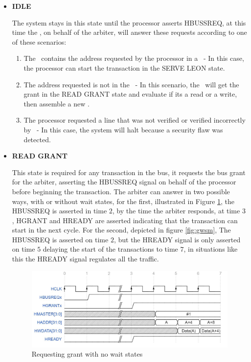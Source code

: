 \begin{itemize}
 \item{\textbf{IDLE}}
 
The system stays in this state until the processor asserts HBUSSREQ, at this time the \handler, on behalf of the arbiter, will answer these requests according to one of these scenarios:
 \begin{enumerate}
     \item The \sbuf~contains the address requested by the processor in a \sline~- In this case, the processor can start the transaction in the SERVE LEON state.
     \item The address requested is not in the \sbuf~- In this scenario, the \handler~will get the grant in the READ GRANT state and evaluate if its a read or a write, then assemble a new \sline.
     \item The processor requested a line that was not verified or verified incorrectly by \seceng~-  In this case, the system will halt because a security flaw was detected.
 \end{enumerate}

 
  \item{\textbf{READ GRANT}}

  This state is required for any transaction in the bus, it requests the bus grant for the arbiter, asserting the HBUSSREQ signal on behalf of the processor before beginning the transaction. The arbiter can answer in two possible ways, with or without wait states, for the first, illustrated in Figure \ref{fig:gnwsm},  the HBUSSREQ is asserted in time $2$, by the time the arbiter responds, at time $3$, HGRANT and HREADY are asserted  indicating that the transaction can start in the next cycle. For the second, depicted in figure \ref{fig:gwsm}, The  HBUSSREQ is asserted on time $2$, but the HREADY signal is only asserted on time $5$ delaying the start of the transactions to time $7$, in situations like this the HREADY signal regulates all the traffic. 
  
  
\begin{figure}[!ht]
    \centering
    \includegraphics[width=\textwidth]{figures/others/read_grant_no_wait_new.JPG}
    \caption{Requesting grant with no wait states  }
    \label{fig:gnwsm}
\end{figure}



\end{itemize}
